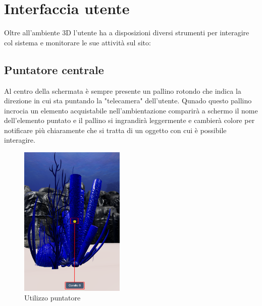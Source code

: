 \section{Interfaccia utente}
Oltre all'ambiente 3D l'utente ha a disposizioni diversi strumenti per interagire col sistema e monitorare le sue attività sul sito:
\subsection{Puntatore centrale}
Al centro della schermata è sempre presente un pallino rotondo che indica la direzione in cui sta puntando la "telecamera" dell'utente. Qunado questo pallino incrocia un elemento acquistabile nell'ambientazione comparirà a schermo il nome dell'elemento puntato e il pallino si ingrandirà leggermente e cambierà colore per notificare più chiaramente che si tratta di un oggetto con cui è possibile interagire.
\begin{figure}
  \renewcommand{\thefigure}{3}
\begin{center}
  \includegraphics[width=5cm]{./res/images/puntatore.png}
 \end{center}
 \caption{Utilizzo puntatore}
  \label{Utilizzo puntatore}
\end{figure}

